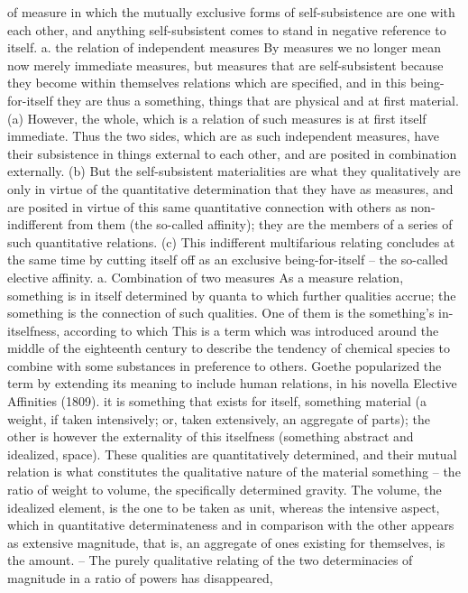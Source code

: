of measure in which the mutually exclusive forms of self-subsistence are one
with each other, and anything self-subsistent comes to stand in negative
reference to itself.
a. the relation of independent measures
By measures we no longer mean now merely immediate measures, but
measures that are self-subsistent because they become within themselves
relations which are specified, and in this being-for-itself they are thus a
something, things that are physical and at first material.
(a) However, the whole, which is a relation of such measures is at first
itself immediate. Thus the two sides, which are as such independent
measures, have their subsistence in things external to each other, and
are posited in combination externally.
(b) But the self-subsistent materialities are what they qualitatively are only
in virtue of the quantitative determination that they have as measures,
and are posited in virtue of this same quantitative connection with
others as non-indifferent from them (the so-called affinity); they are the
members of a series of such quantitative relations.
(c) This indifferent multifarious relating concludes at the same time by
cutting itself off as an exclusive being-for-itself – the so-called elective
affinity.
a. Combination of two measures
As a measure relation, something is in itself determined by quanta to
which further qualities accrue; the something is the connection of such
qualities. One of them is the something’s in-itselfness, according to which
This is a term which was introduced around the middle of the eighteenth century to describe the
tendency of chemical species to combine with some substances in preference to others. Goethe
popularized the term by extending its meaning to include human relations, in his novella Elective
Affinities (1809).
it is something that exists for itself, something material (a weight, if taken
intensively; or, taken extensively, an aggregate of parts); the other is however
the externality of this itselfness (something abstract and idealized, space).
These qualities are quantitatively determined, and their mutual relation
is what constitutes the qualitative nature of the material something – the
ratio of weight to volume, the specifically determined gravity. The volume,
the idealized element, is the one to be taken as unit, whereas the intensive
aspect, which in quantitative determinateness and in comparison with
the other appears as extensive magnitude, that is, an aggregate of ones
existing for themselves, is the amount. – The purely qualitative relating of
the two determinacies of magnitude in a ratio of powers has disappeared,
